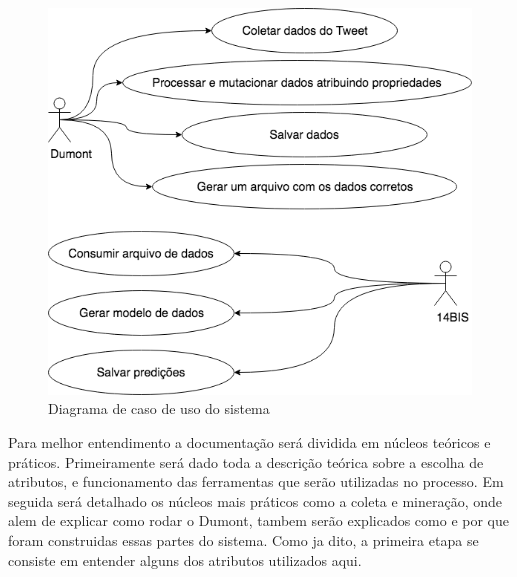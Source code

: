 \begin{figure}
    \centering
    \includegraphics[width=.6\textwidth]{imagens/tcc_caso_de_uso.png}
    \caption{Diagrama de caso de uso do sistema}
    \label{fig:tcc_caso_de_uso}
\end{figure}

Para melhor entendimento a documentação será dividida em núcleos teóricos e práticos. Primeiramente será dado toda a descrição teórica sobre a escolha de atributos, e funcionamento das ferramentas que serão utilizadas no processo. Em seguida será detalhado os núcleos mais práticos como a coleta e mineração, onde alem de explicar como rodar o Dumont, tambem serão explicados como e por que foram construidas essas partes do sistema. Como ja dito, a primeira etapa se consiste em entender alguns dos atributos utilizados aqui.



